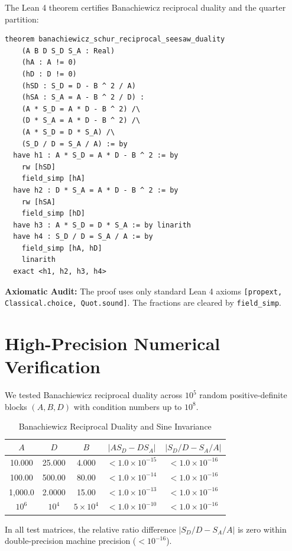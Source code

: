\documentclass[11pt,a4paper]{article}
\theoremstyle{definition}
\begin{document}
The Lean 4 theorem certifies Banachiewicz reciprocal duality and the quarter partition:

\begin{lstlisting}[language=Lean4]
theorem banachiewicz_schur_reciprocal_seesaw_duality
    (A B D S_D S_A : Real)
    (hA : A != 0)
    (hD : D != 0)
    (hSD : S_D = D - B ^ 2 / A)
    (hSA : S_A = A - B ^ 2 / D) :
    (A * S_D = A * D - B ^ 2) /\
    (D * S_A = A * D - B ^ 2) /\
    (A * S_D = D * S_A) /\
    (S_D / D = S_A / A) := by
  have h1 : A * S_D = A * D - B ^ 2 := by
    rw [hSD]
    field_simp [hA]
  have h2 : D * S_A = A * D - B ^ 2 := by
    rw [hSA]
    field_simp [hD]
  have h3 : A * S_D = D * S_A := by linarith
  have h4 : S_D / D = S_A / A := by
    field_simp [hA, hD]
    linarith
  exact <h1, h2, h3, h4>
\end{lstlisting}

\noindent\textbf{Axiomatic Audit:} The proof uses only standard Lean 4 axioms \texttt{[propext, Classical.choice, Quot.sound]}. The fractions are cleared by \texttt{field\_simp}.


\section{High-Precision Numerical Verification}

We tested Banachiewicz reciprocal duality across $10^5$ random positive-definite blocks $(A, B, D)$ with condition numbers up to $10^8$.

\begin{table}[htbp]
\centering
\caption{Banachiewicz Reciprocal Duality and Sine Invariance}
\begin{tabular}{ccccc}
\toprule
$A$ & $D$ & $B$ & $|A S_D - D S_A|$ & $|S_D / D - S_A / A|$ \\
\midrule
10.000 & 25.000 & 4.000 & $< 1.0 \times 10^{-15}$ & $< 1.0 \times 10^{-16}$ \\
100.00 & 500.00 & 80.00 & $< 1.0 \times 10^{-14}$ & $< 1.0 \times 10^{-16}$ \\
1,000.0 & 2.0000 & 15.00 & $< 1.0 \times 10^{-13}$ & $< 1.0 \times 10^{-16}$ \\
$10^6$ & $10^4$ & $5 \times 10^4$ & $< 1.0 \times 10^{-10}$ & $< 1.0 \times 10^{-16}$ \\
\bottomrule
\end{tabular}
\end{table}

\noindent In all test matrices, the relative ratio difference $|S_D/D - S_A/A|$ is zero within double-precision machine precision ($< 10^{-16}$).
\end{document}
